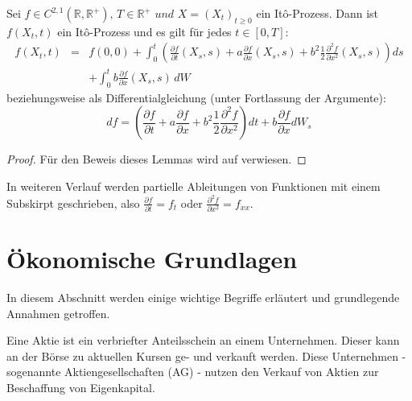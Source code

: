 \begin{Lemma}[Itô]\label{GL:itosLemma}
Sei $f \in C^{2,1}(\mathbb{R}, \mathbb{R}^+), \, T \in \mathbb{R}^+ \textit{ und } X = \left(X_t\right)_{t\geq0}$ ein Itô-Prozess. Dann ist $f(X_t,t)$ ein Itô-Prozess und es gilt für jedes $t \in \left[0,T\right]$:
\begin{eqnarray*}
f(X_t,t) & = & f(0,0) + \int_0^t \! \left( \frac{\partial f}{\partial t} \left(X_s,s\right) + a\frac{\partial f}{\partial x}\left(X_s,s\right) + b^2 \frac{1}{2} \frac{\partial ^2 f}{\partial x^2}\left(X_s,s\right) \right) ds \\
 & & + \int_0^t \! b\frac{\partial f}{\partial x}\left(X_s,s\right) \, dW 
\end{eqnarray*}
beziehungsweise als Differentialgleichung (unter Fortlassung der Argumente):
\begin{equation}
df = \left( \frac{\partial f}{\partial t}  + a\frac{\partial f}{\partial x} + b^2 \frac{1}{2} \frac{\partial ^2 f}{\partial x^2} \right)dt + b\frac{\partial f}{\partial x}dW_s
\end{equation}

\begin{proof}
Für den Beweis dieses Lemmas wird auf \cite{Kupper2} verwiesen.
\end{proof}

\end{Lemma}

\begin{Bemerkung}
In weiteren Verlauf werden partielle Ableitungen von Funktionen mit einem Subskirpt geschrieben, also $ \frac{\partial f}{\partial t} = f_t $ oder $\frac{\partial ^2 f}{\partial x^2} = f_{xx}$.
\end{Bemerkung}



\section{Ökonomische Grundlagen}        %
In diesem Abschnitt werden einige wichtige Begriffe erläutert und grundlegende Annahmen getroffen.

\begin{Definition}[Aktie]
Eine Aktie ist ein verbriefter Anteilsschein an einem Unternehmen. Dieser kann an der Börse zu aktuellen Kursen ge- und verkauft werden. Diese Unternehmen - sogenannte Aktiengesellschaften (AG) - nutzen den Verkauf von Aktien zur Beschaffung von Eigenkapital.
\end{Definition}

